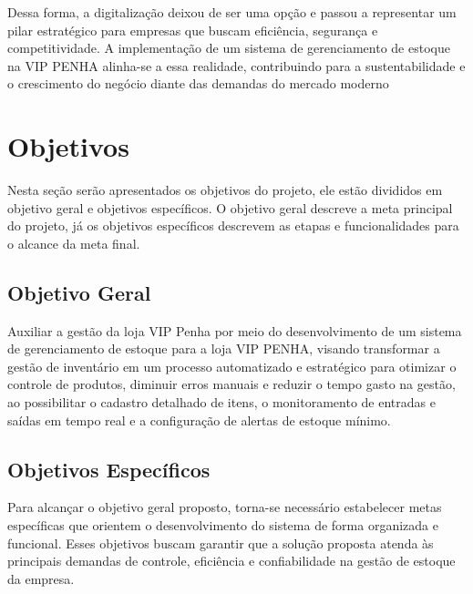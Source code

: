 \documentclass[
	12pt,				%
	openany,			%
	twoside,			%
	a4paper,			%
	english,			%
	brazil				%
	]{abntex2}
\begin{document}
Dessa forma, a digitalização deixou de ser uma opção e passou a representar um pilar estratégico para empresas que buscam eficiência, segurança e competitividade. A implementação de um sistema de gerenciamento de estoque na VIP PENHA alinha-se a essa realidade, contribuindo para a sustentabilidade e o crescimento do negócio diante das demandas do mercado moderno

\section{Objetivos}

Nesta seção serão apresentados os objetivos do projeto, ele estão divididos em objetivo geral e objetivos específicos. O objetivo geral descreve a meta principal do projeto, já os objetivos específicos descrevem as etapas e funcionalidades para o alcance da meta final.

\subsection{Objetivo Geral}

Auxiliar a gestão da loja VIP Penha por meio do desenvolvimento de um sistema de gerenciamento de estoque para a loja VIP PENHA, visando transformar a gestão de inventário em um processo automatizado e estratégico para otimizar o controle de produtos, diminuir erros manuais e reduzir o tempo gasto na gestão, ao possibilitar o cadastro detalhado de itens, o monitoramento de entradas e saídas em tempo real e a configuração de alertas de estoque mínimo. 

\subsection{Objetivos Específicos}

Para alcançar o objetivo geral proposto, torna-se necessário estabelecer metas específicas que orientem o desenvolvimento do sistema de forma organizada e funcional. Esses objetivos buscam garantir que a solução proposta atenda às principais demandas de controle, eficiência e confiabilidade na gestão de estoque da empresa.
\end{document}

